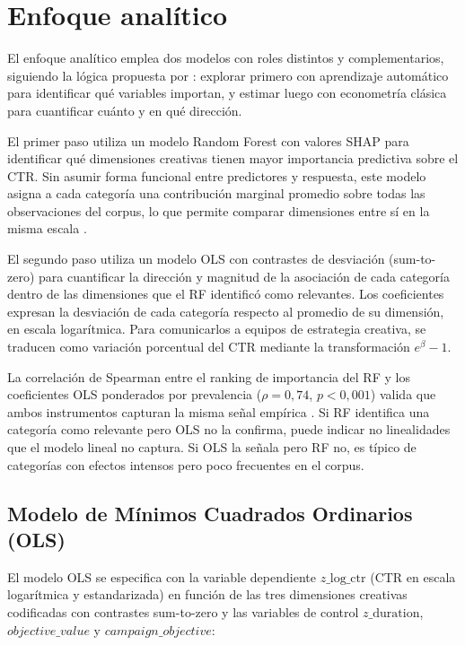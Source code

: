 \documentclass[12pt, a4paper]{report}
\begin{document}
\section{Enfoque analítico}

El enfoque analítico emplea dos modelos con roles distintos y complementarios, siguiendo
la lógica propuesta por \citet{mullainathan2017}: explorar primero con aprendizaje
automático para identificar qué variables importan, y estimar luego con econometría
clásica para cuantificar cuánto y en qué dirección.

El primer paso utiliza un modelo Random Forest con valores SHAP para identificar qué
dimensiones creativas tienen mayor importancia predictiva sobre el CTR. Sin asumir forma
funcional entre predictores y respuesta, este modelo asigna a cada categoría una
contribución marginal promedio sobre todas las observaciones del corpus, lo que permite
comparar dimensiones entre sí en la misma escala \citep{lundberg2017, strobl2007}.

El segundo paso utiliza un modelo OLS con contrastes de desviación (sum-to-zero) para
cuantificar la dirección y magnitud de la asociación de cada categoría dentro de las
dimensiones que el RF identificó como relevantes. Los coeficientes expresan la desviación
de cada categoría respecto al promedio de su dimensión, en escala logarítmica. Para
comunicarlos a equipos de estrategia creativa, se traducen como variación porcentual
del CTR mediante la transformación $e^{\beta} - 1$.

La correlación de Spearman entre el ranking de importancia del RF y los coeficientes OLS
ponderados por prevalencia ($\rho = 0{,}74$, $p < 0{,}001$) valida que ambos instrumentos
capturan la misma señal empírica \citep{breiman2001b}. Si RF identifica una categoría como
relevante pero OLS no la confirma, puede indicar no linealidades que el modelo lineal no
captura. Si OLS la señala pero RF no, es típico de categorías con efectos intensos pero
poco frecuentes en el corpus.

\subsection{Modelo de Mínimos Cuadrados Ordinarios (OLS)}

El modelo OLS se especifica con la variable dependiente $z\_\text{log\_ctr}$ (CTR en escala
logarítmica y estandarizada) en función de las tres dimensiones creativas codificadas con
contrastes sum-to-zero y las variables de control $z\_\text{duration}$,
$\textit{objective\_value}$ y $\textit{campaign\_objective}$:
\end{document}
